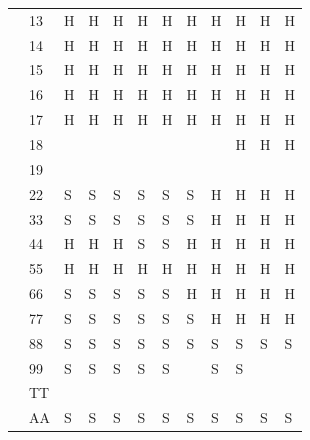 \documentclass[letterpaper]{article}
\begin{document}
{\begin{minipage}[t][81mm][t]{49.5mm}
\begin{tabular}{C{2.4mm}|C{6.4mm}|C{2.9mm}C{2.9mm}C{2.9mm}C{2.9mm}C{2.9mm}C{2.9mm}C{2.9mm}C{2.9mm}C{2.9mm}C{2.9mm}}
             & 13 & H & H & H & H & H & H & H & H & H & H \\
            & 14   & H & H & H & H & H & H & H & H & H & H \\
            & 15   & H & H & H & H & H & H & H & H & H & H \\
            & 16   & H & H & H & H & H & H & H & H & H & H \\
            & 17   & H & H & H & H & H & H & H & H & H & H \\
            & 18   &  &  &  &  &  &  &  & H & H & H \\
            & 19   &  &  &  &  &  &  &  &  &  &  \\ \hline
             & 22   & S & S & S & S & S & S & H & H & H & H \\
            & 33   & S & S & S & S & S & S & H & H & H & H \\
            & 44   & H & H & H & S & S & H & H & H & H & H \\
            & 55   & H & H & H & H & H & H & H & H & H & H \\
            & 66   & S & S & S & S & S & H & H & H & H & H \\
            & 77   & S & S & S & S & S & S & H & H & H & H \\
            & 88   & S & S & S & S & S & S & S & S & S & S \\
            & 99   & S & S & S & S & S &  & S & S &  &  \\
            & TT   &  &  &  &  &  &  &  &  &  &  \\
            & AA   & S & S & S & S & S & S & S & S & S & S \\
        \end{tabular}\\


\end{minipage}}
\end{document}
